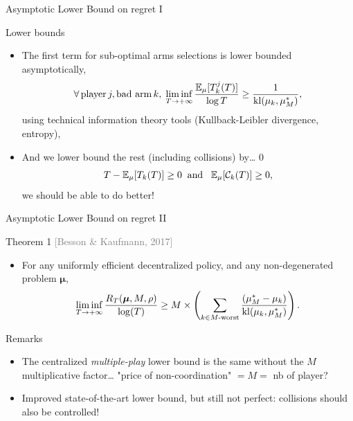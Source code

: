 \documentclass[12pt,english,ignorenonframetext,]{beamer}
\providecommand{\tightlist}{%
  \setlength{\itemsep}{0pt}\setlength{\parskip}{0pt}}
\begin{document}
\begin{frame}{Asymptotic Lower Bound on regret I}

\begin{block}{Lower bounds}

\begin{itemize}
\tightlist
\item
  The first term for sub-optimal arms selections is lower bounded
  asymptotically,
  \[\forall\, \text{player}\, j, \text{bad arm}\,k,\; \mathop{\lim\inf}\limits_{T \to +\infty} \frac{\mathbb{E}_{\mu}[T_k^j(T)]}{\log T} \geq \frac{1}{\mathrm{kl}(\mu_k, \mu_M^*)},\]
  using technical information theory tools (Kullback-Leibler divergence,
  entropy),\pause
\item
  And we lower bound the rest (including collisions) by\ldots{} \(0\)
  \[T - \mathbb{E}_{\mu}[T_k(T)] \geq 0 \;\;\text{and}\;\;\; \mathbb{E}_{\mu}[\mathcal{C}_k(T)] \geq 0,\]
  \Sadey[1.4] we should be able to do better!
\end{itemize}

\end{block}

\end{frame}

\begin{frame}{Asymptotic Lower Bound on regret II}

\begin{block}{Theorem 1
\hfill{}\textcolor{gray}{[Besson \& Kaufmann, 2017]}}

\begin{itemize}
\tightlist
\item
  For any uniformly efficient decentralized policy, and any
  non-degenerated problem \(\boldsymbol{\mu}\), \vspace*{-10pt}
  \[ \mathop{\lim\inf}\limits_{T \to +\infty} \frac{R_T(\boldsymbol{\mu}, M, \rho)}{\log(T)} \geq M \times \left( \sum_{k \in M\text{-}\mathrm{worst}} \frac{(\mu_M^* -  \mu_k)}{\mathrm{kl}(\mu_k, \mu_M^*)} \right) . \]
\end{itemize}

\pause

\end{block}

\begin{block}{Remarks}

\begin{itemize}
\tightlist
\item
  The centralized \emph{multiple-play} lower bound is the same without
  the \(M\) multiplicative factor\ldots{}
  \hook \alert{"price of non-coordination"} \(= M =\) nb of player?
\item
  Improved state-of-the-art lower bound, but still not perfect:
  collisions should also be controlled!
\end{itemize}

\end{block}

\end{frame}
\end{document}
